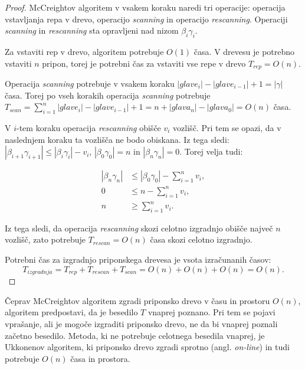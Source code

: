 \begin{proof}
    McCreightov algoritem v vsakem koraku naredi tri operacije: operacija vstavljanja repa v drevo, operacijo \textit{scanning} in operacijo \textit{rescanning}. Operaciji  \textit{scanning} in \textit{rescanning} sta opravljeni nad nizom $\beta_i\gamma_i$. 
    
    Za vstaviti rep v drevo, algoritem potrebuje $O(1)$ časa. V drevesu je potrebno vstaviti $n$ pripon, torej je potrebni čas za vstaviti vse repe v drevo $T_{\textit{rep}}=O(n)$.

    Operacija \textit{scanning} potrebuje v vsakem koraku $|glave_i|-|glave_{i-1}|+1=|\gamma|$ časa. Torej po vseh korakih operacija \textit{scanning}  potrebuje $T_{\textit{scan}}=\sum_{i=1}^n |glave_i|-|glave_{i-1}|+1= n + |glava_n|-|glava_0|=O(n)$ časa.

    V $i$-tem koraku operacija \textit{rescanning} obišče $v_i$ vozlišč. Pri tem se opazi, da v naslednjem koraku ta vozlišča ne bodo obiskana. Iz tega sledi:  $|\beta_{i+1}\gamma_{i+1}|\le|\beta_i\gamma_i|-v_i$, $|\beta_0\gamma_0|=n$ in $|\beta_n\gamma_n|=0$. Torej velja tudi:
    
    \begin{equation*} 
        \begin{split}
        |\beta_n\gamma_n|&\le|\beta_0\gamma_0|- \sum_{i=1}^n v_i,\\
        0&\le n- \sum_{i=1}^n v_i,\\
        n&\ge \sum_{i=1}^n v_i.
        \end{split}
    \end{equation*}
    
    Iz tega sledi, da operacija \textit{rescanning} skozi celotno izgradnjo obišče največ $n$ vozlišč, zato potrebuje $T_{\textit{rescan}}=O(n)$ časa skozi celotno izgradnjo.
    
    Potrebni čas za izgradnjo priponskega drevesa je vsota izračunanih časov: 
    $$T_{\textit{izgradnja}}=T_{\textit{rep}}+T_{\textit{rescan}}+T_{\textit{scan}}=O(n)+O(n)+O(n)=O(n).$$
\end{proof}

Čeprav McCreightov algoritem zgradi priponsko drevo v času in prostoru $O(n)$, algoritem predpostavi, da je besedilo $T$ vnaprej poznano. Pri tem se pojavi vprašanje, ali je mogoče izgraditi priponsko drevo, ne da bi vnaprej poznali začetno besedilo. Metoda, ki ne potrebuje celotnega besedila vnaprej, je Ukkonenov algoritem, ki priponsko drevo zgradi sprotno (angl. \textit{on-line}) in tudi potrebuje $O(n)$ časa in prostora.

